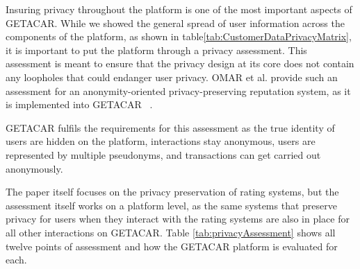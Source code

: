 Insuring privacy throughout the platform is one of the most important aspects of GETACAR. While we showed the general spread of user information across the components of the platform, as shown in table\ref{tab:CustomerDataPrivacyMatrix}, it is important to put the platform through a privacy assessment. This assessment is meant to ensure that the privacy design at its core does not contain any loopholes that could endanger user privacy. OMAR et al. provide such an assessment for an anonymity-oriented privacy-preserving reputation system, as it is implemented into GETACAR ~\cite{HasanOmar}.

GETACAR fulfils the requirements for this assessment as the true identity of users are hidden on the platform, interactions stay anonymous, users are represented by multiple pseudonyms, and transactions can get carried out anonymously. 

The paper itself focuses on the privacy preservation of rating systems, but the assessment itself works on a platform level, as the same systems that preserve privacy for users when they interact with the rating systems are also in place for all other interactions on GETACAR. Table \ref{tab:privacyAssessment} shows all twelve  points of assessment and how the GETACAR platform is evaluated for each.


